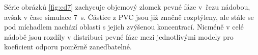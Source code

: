 Série obrázků \ref{fig:cd7} zachycuje objemový zlomek pevné fáze v~řezu nádobou, avšak v čase simulace \SI{7}{\second}. Částice z PVC jsou již značně rozptýleny, ale stále se pod míchadlem nachází oblasti s jejich zvýšenou koncentrací. Nicméně v celé nádobě jsou rozdíly v distribuci pevné fáze mezi jednotlivými modely pro koeficient odporu poměrně zanedbatelné.

\begin{figure}[t!]
 \centering

  \qquad             

\end{figure}
